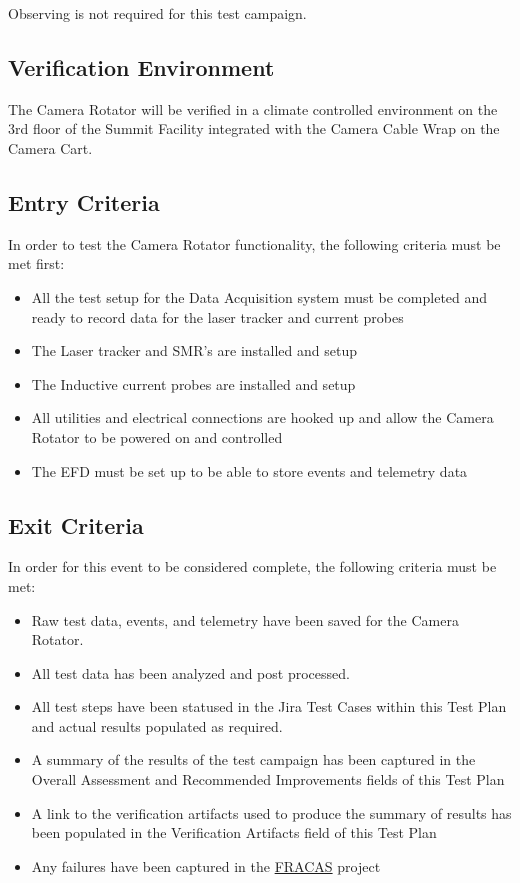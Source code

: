 \documentclass[SE,lsstdraft,STR,toc]{lsstdoc}
\providecommand{\tightlist}{
  \setlength{\itemsep}{0pt}\setlength{\parskip}{0pt}}
\begin{document}
  Observing is not required for this test campaign.

\subsection{Verification Environment}
\label{sect:hwconf}
  The Camera Rotator will be verified in a climate controlled environment
on the 3rd floor of the Summit Facility integrated with the Camera Cable
Wrap on the Camera Cart.


  \subsection{Entry Criteria}
  In order to test the Camera Rotator functionality, the following
criteria must be met first:

\begin{itemize}
\tightlist
\item
  All the test setup for the Data Acquisition system must be completed
  and ready to record data for the laser tracker and current probes
\item
  The Laser tracker and SMR's are installed and setup
\item
  The Inductive current probes are installed and setup
\item
  All utilities and electrical connections are hooked up and allow the
  Camera Rotator to be powered on and controlled
\item
  The EFD must be set up to be able to store events and telemetry data
\end{itemize}


  \subsection{Exit Criteria}
  In order for this event to be considered complete, the following
criteria must be met:

\begin{itemize}
\tightlist
\item
  Raw test data, events, and telemetry have been saved for the Camera
  Rotator.
\item
  All test data has been analyzed and post processed.
\item
  All test steps have been statused in the Jira Test Cases within this
  Test Plan and actual results populated as required.
\item
  A summary of the results of the test campaign has been captured in the
  Overall Assessment and Recommended Improvements fields of this Test
  Plan
\item
  A link to the verification artifacts used to produce the summary of
  results has been populated in the Verification Artifacts field of this
  Test Plan
\item
  Any failures have been captured in the
  \href{https://jira.lsstcorp.org/projects/FRACAS/issues/}{FRACAS}
  project
\end{itemize}
\end{document}
